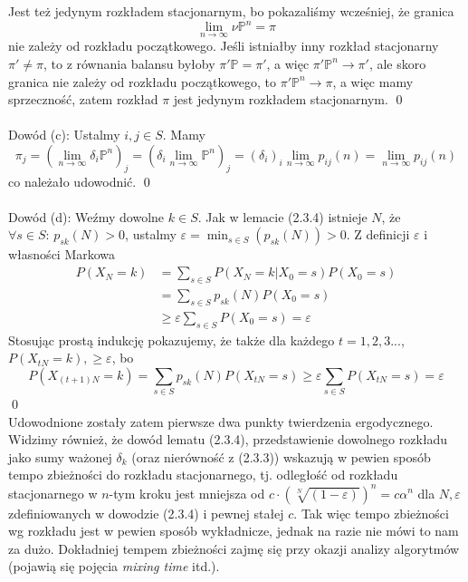 \documentclass[a4paper]{article}
\begin{document}
Jest też jedynym rozkładem stacjonarnym, bo pokazaliśmy wcześniej, że granica $$\lim\limits_{n \to \infty} \nu\mathbb{P}^n = \pi$$ nie zależy od rozkładu początkowego. Jeśli istniałby inny rozkład stacjonarny $\pi' \neq \pi$, to z równania balansu byłoby $\pi'\mathbb{P} = \pi'$, a więc $\pi'\mathbb{P}^n \to \pi'$, ale skoro granica nie zależy od rozkładu początkowego, to $\pi'\mathbb{P}^n \to \pi$, a więc mamy sprzeczność, zatem rozkład $\pi$ jest jedynym rozkładem stacjonarnym. \qed\\\\
Dowód (c): Ustalmy $i,j \in S$. Mamy $$\pi_j = (\lim\limits_{n \to \infty} \delta_i\mathbb{P}^n)_j = (\delta_i \lim\limits_{n \to \infty} \mathbb{P}^n)_j = (\delta_i)_i \lim\limits_{n \to \infty} p_{ij}(n) = \lim\limits_{n \to \infty} p_{ij}(n)$$ co należało udowodnić. \qed\\\\
Dowód (d): Weźmy dowolne $k \in S$. Jak w lemacie (2.3.4) istnieje $N$, że $\forall s \in S:\, p_{sk}(N) > 0$, ustalmy $\varepsilon = \min_{s \in S}(p_{sk}(N)) > 0$. Z definicji $\varepsilon$ i własności Markowa 
\begin{align*}
P(X_N = k) &= \sum\limits_{s \in S} P(X_N = k|X_0 = s)P(X_0 = s) \\
&= \sum\limits_{s \in S} p_{sk}(N)P(X_0 = s) \\
&\geq \varepsilon \sum\limits_{s \in S} P(X_0 = s) = \varepsilon
\end{align*}
Stosując prostą indukcję pokazujemy, że także dla każdego $t = 1,2,3...$, $P(X_{tN} = k), \geq \varepsilon$, bo 
$$P(X_{(t+1)N} = k) = \sum\limits_{s \in S} p_{sk}(N)P(X_{tN} = s) \geq \varepsilon \sum\limits_{s \in S} P(X_{tN} = s) = \varepsilon$$
\qed
\\ Udowodnione zostały zatem pierwsze dwa punkty twierdzenia ergodycznego. Widzimy również, że dowód lematu (2.3.4), przedstawienie dowolnego rozkładu jako sumy ważonej $\delta_k$ (oraz nierówność z (2.3.3)) wskazują w pewien sposób tempo zbieżności do rozkładu stacjonarnego, tj. odległość od rozkładu stacjonarnego w $n$-tym kroku jest mniejsza od $c \cdot (\sqrt[N]{(1-\varepsilon)})^n = c\alpha^n$ dla $N, \varepsilon$ zdefiniowanych w dowodzie (2.3.4) i pewnej stałej $c$. Tak więc tempo zbieżności wg rozkładu jest w pewien sposób wykładnicze, jednak na razie nie mówi to nam za dużo. Dokładniej tempem zbieżności zajmę się przy okazji analizy algorytmów (pojawią się pojęcia \textit{mixing time} itd.).
\\\\
\end{document}
